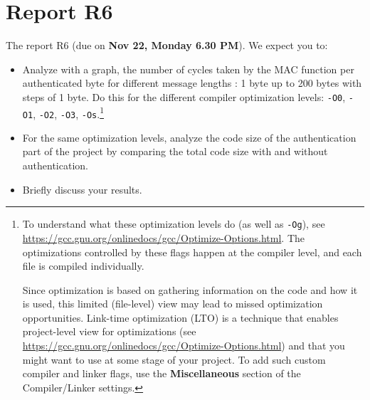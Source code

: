 \section{Report R6}

The report R6 (due on \textbf{Nov 22, Monday 6.30 PM}). We expect you to:
\begin{itemize}
    \item Analyze with a graph, the number of cycles taken by the MAC function
        per authenticated byte for different message lengths : 1 byte up to 200
        bytes with steps of 1 byte. Do this for the different compiler
        optimization levels:
        \texttt{-O0},
        \texttt{-O1},
        \texttt{-O2},
        \texttt{-O3},
        \texttt{-Os}.\footnote{%
            To understand what these optimization levels do (as well as
            \texttt{-Og}), see
            \url{https://gcc.gnu.org/onlinedocs/gcc/Optimize-Options.html}.
            The optimizations controlled by these flags happen at the compiler
            level, and each file is compiled individually.

            Since optimization is based on gathering information on the
            code and how it is used, this limited (file-level) view may lead to
            missed optimization opportunities.
            Link-time optimization (LTO) is a technique that enables
            project-level view for optimizations (see
            \url{https://gcc.gnu.org/onlinedocs/gcc/Optimize-Options.html})
            and that you might want to use at some stage of your project.
            To add such custom compiler and linker flags, use the
            \textbf{Miscellaneous} section of the Compiler/Linker settings.
        }
    \item For the same optimization levels, analyze the code size of the
        authentication part of the project by comparing the total code size with
        and without authentication.
    \item Briefly discuss your results.
\end{itemize}

